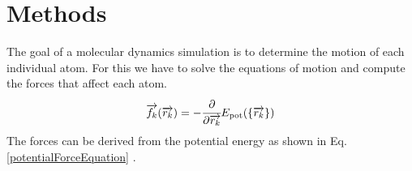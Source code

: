 \chapter{Methods}
\begin{comment}
	0. Verlet Step
	1. Describe the Lenard Jones Potential
	2. Describe the Berendsen Thermostat
	3. Describe the Gupta 
	
\end{comment}
\begin{comment}
	Atoms are discreticed into the Postitions, Velocities and Forces 
	Second propagate the atom in the discriticed realm given constant Forces
		-> Velocity-Verlet Integration
	
	Compute Forces somehow
	-> Potentials
	LJ Potential 
	Gupta Potential
	
	Thermodynamic Effects
	Berendsen Thermostat
		->Gentle Way of resealing the Velocities
		
\end{comment}
\begin{comment}
goals of a md simulation
- determine the motion of each atom
	-> solve equation of motion 
	-> compute forces
	-> From the dirivation of the potential energy we can get the forces

- disciticed in time

\end{comment}
The goal of a molecular dynamics simulation is to determine the motion of each individual atom. For this we have to solve the equations of motion and compute the forces that affect each atom.
\begin{equation}
	\label{potentialForceEquation}
	\overrightarrow{f_{k}}(\overrightarrow{r_{k}}) = -\cfrac{\displaystyle\partial}{\displaystyle \partial \overrightarrow{r_{k}}} E_{\mathrm{pot}}(\{\overrightarrow{r_{k}}\}) 
\end{equation}
The forces can be derived from the potential energy as shown in Eq.  \ref{potentialForceEquation} \cite[][]{molDymCourse}. 


